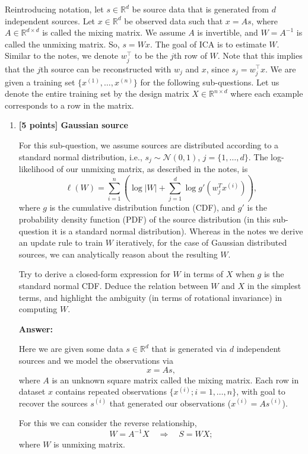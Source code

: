 \documentclass{article}
\begin{document}
Reintroducing notation, let $s \in \mathbb{R}^d$ be source data that is generated from $d$ independent sources. Let $x \in \mathbb{R}^d$ be observed data such that $x = As$, where $A \in \mathbb{R}^{d \times d}$ is called the mixing matrix. We assume $A$ is invertible, and $W = A^{-1}$ is called the unmixing matrix. So, $s = Wx$. The goal of ICA is to estimate $W$. Similar to the notes, we denote $w_j^\top$ to be the $j$th row of $W$. Note that this implies that the $j$th source can be reconstructed with $w_j$ and $x$, since $s_j = w_j^\top x$. We are given a training set $\{x^{(1)}, \ldots, x^{(n)}\}$ for the following sub-questions. Let us denote the entire training set by the design matrix $X \in \mathbb{R}^{n \times d}$ where each example corresponds to a row in the matrix.


\begin{enumerate}[label=(\alph*)]
    \item \textbf{[5 points] Gaussian source}

    For this sub-question, we assume sources are distributed according to a standard normal
distribution, i.e., $s_j \sim \mathcal{N} (0, 1)$, $j = \{1, \ldots, d\}$. The log-likelihood of our unmixing matrix, as described in the notes, is
\[ 
\ell(W) = \sum_{i=1}^{n} \left(\log |W| + \sum_{j=1}^{d}  \log g'(w^T_j x^{(i)})\right), 
\]
where $g$ is the cumulative distribution function (CDF), and $g'$ is the probability density function (PDF) of the source distribution (in this sub-question it is a standard normal distribution). Whereas in the notes we derive an update rule to train $W$ iteratively, for the case of Gaussian distributed sources, we can analytically reason about the resulting $W$. 

Try to derive a closed-form expression for $W$ in terms of $X$ when $g$ is the standard normal CDF. Deduce the relation between $W$ and $X$ in the simplest terms, and highlight the ambiguity (in terms of rotational invariance) in computing $W$.


\textbf{Answer:}

Here we are given some data $s \in \mathbb{R}^d$ that is generated via $d$ independent sources and we  model the observations via
\[x = As,
\]
where $A$ is an unknown square matrix called the mixing matrix. Each row in dataset $x$ contains repeated observations  $\{x^{(i)}; i = 1, \ldots , n\}$, with goal to recover the sources $s^{(i)}$ that generated our observations ($x^{(i)} = As^{(i)}$).

For this we can consider the reverse relationship,
\[
W = A^{-1}X \quad\Rightarrow\quad S = WX;
\]
where $W$ is unmixing matrix.


\end{enumerate}
\end{document}
